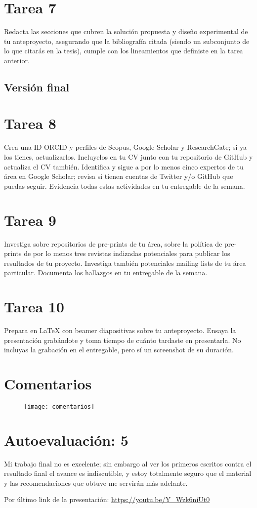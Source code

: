 \documentclass[12pt,letterpaper]{article}
\begin{document}
\section*{Tarea 7}
Redacta las secciones que cubren la solución propuesta y diseño experimental de tu anteproyecto, asegurando que la bibliografía citada (siendo un subconjunto de lo que citarás en la tesis), cumple con los lineamientos que definiste en la tarea anterior.

\subsection*{Versión final}

\section*{Tarea 8}
Crea una ID ORCID y perfiles de Scopus, Google Scholar y ResearchGate; si ya los tienes, actualizarlos. Incluyelos en tu CV junto con tu repositorio de GitHub y actualiza el CV también. Identifica y sigue a por lo menos cinco expertos de tu área en Google Scholar; revisa si tienen cuentas de Twitter y/o GitHub que puedas seguir. Evidencia todas estas actividades en tu entregable de la semana.

\section*{Tarea 9}
Investiga sobre repositorios de pre-prints de tu área, sobre la política de pre-prints de por lo menos tres revistas indizadas potenciales para publicar los resultados de tu proyecto. Investiga también potenciales mailing lists de tu área particular. Documenta los hallazgos en tu entregable de la semana.

\section*{Tarea 10}
Prepara en LaTeX con beamer diapositivas sobre tu anteproyecto. Ensaya la presentación grabándote y toma tiempo de cuánto tardaste en presentarla. No incluyas la grabación en el entregable, pero sí un screenshot de su duración.

\section*{Comentarios}
\begin{figure}[h!]
	\texttt{[image: comentarios]}
\end{figure}

\section*{Autoevaluación: 5 }
 Mi trabajo final no es excelente; sin embargo al ver los primeros escritos contra el resultado final el avance es indiscutible, y estoy totalmente seguro que el material y las recomendaciones que obtuve me servirán más adelante.
 
\vspace{1 cm}
Por último link de la presentación: \url{https://youtu.be/Y_Wzk6niUt0}
\end{document}
